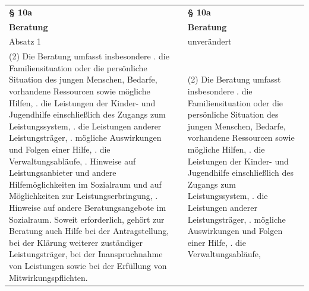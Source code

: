 \documentclass[10pt,a4paper,landscape]{article}
\begin{document}
\begin{longtable}{|L{8.2cm}|L{8.2cm}|L{8.2cm}|}
\hhline{|---|}
\textbf{\S{} 10a} &  & \textbf{\S{} 10a} \\
\hhline{|---|}
\textbf{Beratung} &  & \textbf{Beratung} \\
\hhline{|---|}
Absatz 1 &  & unverändert \\
\hhline{|---|}
(2) Die Beratung umfasst insbesondere  .   die Familiensituation oder die  \newline persönliche Situation des jungen  \newline Menschen, Bedarfe, vorhandene  \newline Ressourcen sowie mögliche Hilfen,   . die Leistungen der Kinder- und  \newline Jugendhilfe einschließlich des Zugangs  \newline zum Leistungssystem,   . die Leistungen anderer Leistungsträger,   . mögliche Auswirkungen und Folgen  \newline einer Hilfe,   . die Verwaltungsabläufe,   . Hinweise auf Leistungsanbieter und  \newline andere Hilfemöglichkeiten im Sozialraum  und auf Möglichkeiten zur  \newline Leistungserbringung,   . Hinweise auf andere Beratungsangebote  \newline im \textcolor{diffred}{Sozialraum.}   \newline Soweit erforderlich, gehört zur Beratung  \newline auch Hilfe bei der Antragstellung, bei der  \newline Klärung weiterer zuständiger  \newline Leistungsträger, bei der Inanspruchnahme  \newline von Leistungen sowie bei der Erfüllung von  \newline Mitwirkungspflichten. &  & (2) Die Beratung umfasst insbesondere  .   die Familiensituation oder die  \newline persönliche Situation des jungen  \newline Menschen, Bedarfe, vorhandene  \newline Ressourcen sowie mögliche Hilfen,   . die Leistungen der Kinder- und  \newline Jugendhilfe einschließlich des Zugangs  \newline zum Leistungssystem,   . die Leistungen anderer Leistungsträger,   . mögliche Auswirkungen und Folgen  \newline einer Hilfe,   . die Verwaltungsabläufe,   
\end{longtable}
\end{document}
